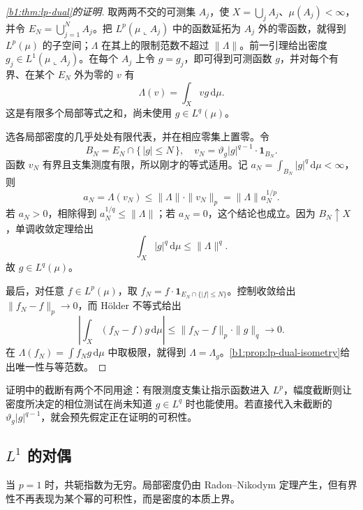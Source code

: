 \begin{proof}[\cref{b1:thm:lp-dual}的证明]
取两两不交的可测集 \(A_j\)，使 \(X=\bigcup_jA_j\)、\(\mu(A_j)<\infty\)，并令 \(E_N=\bigcup_{j=1}^NA_j\)。把 \(L^p(\mu\llcorner A_j)\) 中的函数延拓为 \(A_j\) 外的零函数，就得到 \(L^p(\mu)\) 的子空间；\(\Lambda\) 在其上的限制范数不超过 \(\|\Lambda\|\)。前一引理给出密度 \(g_j\in L^1(\mu\llcorner A_j)\)。在每个 \(A_j\) 上令 \(g=g_j\)，即可得到可测函数 \(g\)，并对每个有界、在某个 \(E_N\) 外为零的 \(v\) 有
\[
 \Lambda(v)=\int_Xvg\,\mathrm d\mu.
\]
这是有限多个局部等式之和，尚未使用 \(g\in L^q(\mu)\)。

选各局部密度的几乎处处有限代表，并在相应零集上置零。令
\[
 B_N=E_N\cap\{\,|g|\le N\,\},
 \quad v_N=\vartheta_g|g|^{q-1}\cdot\mathbf1_{B_N}.
\]
函数 \(v_N\) 有界且支集测度有限，所以刚才的等式适用。记
\(a_N=\int_{B_N}|g|^q\,\mathrm d\mu<\infty\)，则
\[
 a_N=\Lambda(v_N)
 \le\|\Lambda\|\cdot\|v_N\|_p
 =\|\Lambda\|a_N^{1/p}.
\]
若 \(a_N>0\)，相除得到 \(a_N^{1/q}\le\|\Lambda\|\)；若 \(a_N=0\)，这个结论也成立。因为 \(B_N\uparrow X\)，单调收敛定理给出
\[
 \int_X|g|^q\,\mathrm d\mu\le\|\Lambda\|^q.
\]
故 \(g\in L^q(\mu)\)。

最后，对任意 \(f\in L^p(\mu)\)，取
\(f_N=f\cdot\mathbf1_{E_N\cap\{|f|\le N\}}\)。控制收敛给出 \(\|f_N-f\|_p\rightarrow0\)，而 Hölder 不等式给出
\[
 \left|\int_X(f_N-f)g\,\mathrm d\mu\right|
 \le\|f_N-f\|_p\cdot\|g\|_q\longrightarrow0.
\]
在 \(\Lambda(f_N)=\int f_Ng\,\mathrm d\mu\) 中取极限，就得到 \(\Lambda=\Lambda_g\)。\cref{b1:prop:lp-dual-isometry}给出唯一性与等范数。
\end{proof}

证明中的截断有两个不同用途：有限测度支集让指示函数进入 \(L^p\)，幅度截断则让密度所决定的相位测试在尚未知道 \(g\in L^q\) 时也能使用。若直接代入未截断的 \(\vartheta_g|g|^{q-1}\)，就会预先假定正在证明的可积性。

\subsection{\texorpdfstring{\(L^1\)}{L1} 的对偶}
\label{b1:subsec:100303}

当 \(p=1\) 时，共轭指数为无穷。局部密度仍由 Radon--Nikodym 定理产生，但有界性不再表现为某个幂的可积性，而是密度的本质上界。

